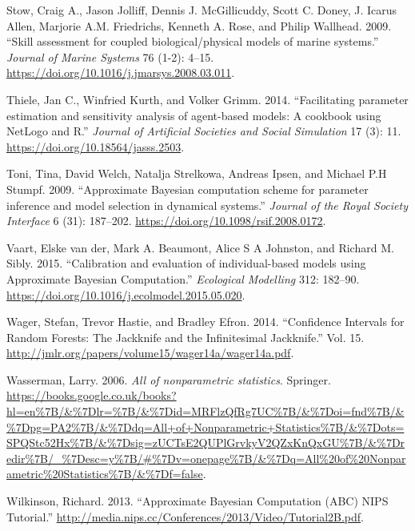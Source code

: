 \documentclass[]{article}
\begin{document}
\leavevmode\hypertarget{ref-Stow2009}{}%
Stow, Craig A., Jason Jolliff, Dennis J. McGillicuddy, Scott C. Doney, J. Icarus Allen, Marjorie A.M. Friedrichs, Kenneth A. Rose, and Philip Wallhead. 2009. ``Skill assessment for coupled biological/physical models of marine systems.'' \emph{Journal of Marine Systems} 76 (1-2): 4--15. \url{https://doi.org/10.1016/j.jmarsys.2008.03.011}.

\leavevmode\hypertarget{ref-Thiele2014}{}%
Thiele, Jan C., Winfried Kurth, and Volker Grimm. 2014. ``Facilitating parameter estimation and sensitivity analysis of agent-based models: A cookbook using NetLogo and R.'' \emph{Journal of Artificial Societies and Social Simulation} 17 (3): 11. \url{https://doi.org/10.18564/jasss.2503}.

\leavevmode\hypertarget{ref-Toni2009}{}%
Toni, Tina, David Welch, Natalja Strelkowa, Andreas Ipsen, and Michael P.H Stumpf. 2009. ``Approximate Bayesian computation scheme for parameter inference and model selection in dynamical systems.'' \emph{Journal of the Royal Society Interface} 6 (31): 187--202. \url{https://doi.org/10.1098/rsif.2008.0172}.

\leavevmode\hypertarget{ref-VanderVaart2015}{}%
Vaart, Elske van der, Mark A. Beaumont, Alice S A Johnston, and Richard M. Sibly. 2015. ``Calibration and evaluation of individual-based models using Approximate Bayesian Computation.'' \emph{Ecological Modelling} 312: 182--90. \url{https://doi.org/10.1016/j.ecolmodel.2015.05.020}.

\leavevmode\hypertarget{ref-Wager2014}{}%
Wager, Stefan, Trevor Hastie, and Bradley Efron. 2014. ``Confidence Intervals for Random Forests: The Jackknife and the Infinitesimal Jackknife.'' Vol. 15. \url{http://jmlr.org/papers/volume15/wager14a/wager14a.pdf}.

\leavevmode\hypertarget{ref-Wasserman2006}{}%
Wasserman, Larry. 2006. \emph{All of nonparametric statistics}. Springer. \url{https://books.google.co.uk/books?hl=en\%7B/\&\%7Dlr=\%7B/\&\%7Did=MRFlzQfRg7UC\%7B/\&\%7Doi=fnd\%7B/\&\%7Dpg=PA2\%7B/\&\%7Ddq=All+of+Nonparametric+Statistics\%7B/\&\%7Dots=SPQStc52Hx\%7B/\&\%7Dsig=zUCTsE2QUPlGrvkyV2QZxKnQxGU\%7B/\&\%7Dredir\%7B/_\%7Desc=y\%7B/\#\%7Dv=onepage\%7B/\&\%7Dq=All\%20of\%20Nonparametric\%20Statistics\%7B/\&\%7Df=false}.

\leavevmode\hypertarget{ref-wilkinsonnips}{}%
Wilkinson, Richard. 2013. ``Approximate Bayesian Computation (ABC) NIPS Tutorial.'' \url{http://media.nips.cc/Conferences/2013/Video/Tutorial2B.pdf}.
\end{document}
